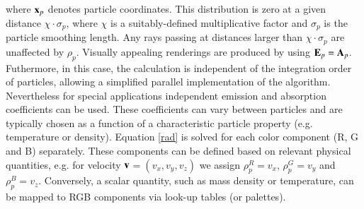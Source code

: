 \documentclass[1p]{elsarticle}
\begin{document}
\begin{itemize}
where ${\bf x}_p$ denotes particle coordinates. This distribution is zero at a given distance $\chi\cdot\sigma_p$, 
where $\chi$ is a suitably-defined multiplicative factor and $\sigma_p$ is the particle smoothing length. Any rays passing at distances larger than $\chi\cdot\sigma_p$ are unaffected by $\rho_p$. Visually appealing renderings are produced by using ${\bf E}_p = {\bf A}_p$. Futhermore, in this case, the calculation is independent of the integration order of particles, allowing a simplified parallel implementation of the algorithm. Nevertheless for special applications independent emission and absorption coefficients can be used. These coefficients
can vary between particles and are typically chosen as a function of a characteristic
particle property (e.g. temperature or density).
Equation \eqref{rad} is solved for each color component (R, G and B) separately. These components can be defined based on relevant physical quantities, e.g. for velocity $\bf v$$=(v_x, v_y, v_z)$ we assign $\rho_p^{R}=v_x$, $\rho_p^{G}=v_y$ and $\rho_p^{B}=v_z$. Conversely, a scalar quantity, such as mass density or temperature, can be mapped to RGB components via look-up tables (or palettes). 
\end{itemize}
\end{document}
